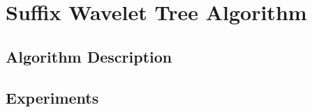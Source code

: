 \section{Suffix Wavelet Tree Algorithm}

\subsection{Algorithm Description}

\subsection{Experiments}